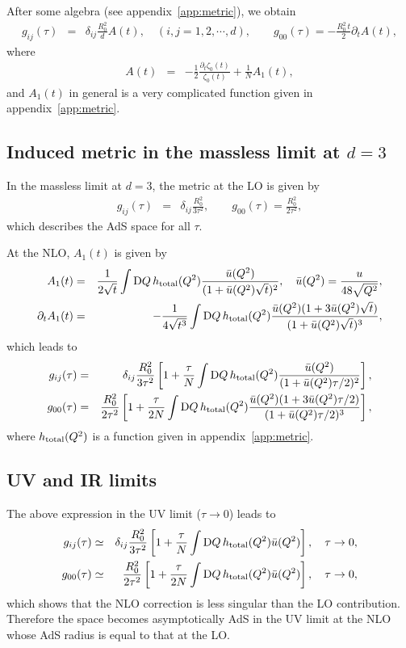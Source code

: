 \documentclass[preprint]{ptephy_v1}%
\newcommand{\rmD}{{\rm D}}
\begin{document}
After some  algebra (see appendix~\ref{app:metric}), we obtain
\begin{eqnarray}
g_{ij}(\tau) &=& \delta_{ij}\frac{ R_0^2}{d} A(t), \quad (i,j=1, 2, \cdots, d), \qquad g_{00}(\tau) = - \frac{ R_0^2\,  t}{2}\partial_t A(t), 
\end{eqnarray}
where
\begin{eqnarray}
A(t) &=& -\frac{1}{2} \frac{\partial_t\zeta_0(t)}{\zeta_0(t)} +\frac{1}{N}A_1(t), 
\end{eqnarray}
and $A_1(t)$ in general is a very complicated function given in appendix~\ref{app:metric}.

\subsection{Induced metric in the massless limit at $d=3$}
In the massless limit at $d=3$, the metric at the LO  is  given by 
 \begin{eqnarray}
g_{ij}(\tau) &=&\delta_{ij} \frac{R_0^2}{3\tau^2}, \qquad g_{00}(\tau) = \frac{R_0^2}{2\tau^2},
\end{eqnarray}
which describes the AdS space for all $\tau$.

At the NLO, $A_1(t)$ is given by
\begin{eqnarray}
A_1(t) &=&  \frac{1}{2\sqrt{t}}\int \rmD Q\, h_{\rm total}(Q^2)\frac{\bar u(Q^2)}{(1+\bar u(Q^2)\sqrt{t})^2}, 
\quad \bar u(Q^2) = \frac{u}{48\sqrt{Q^2}}, \label{eq:A1} \\
\partial_t A_1(t) &=&  -\frac{1}{4\sqrt{t^3}}\int \rmD Q\, h_{\rm total}(Q^2)\frac{\bar u(Q^2)(1+3\bar u(Q^2)\sqrt{t})}{(1+\bar u(Q^2)\sqrt{t})^3}, \label{eq:pA1} 
\end{eqnarray}
which leads to
\begin{eqnarray}
g_{ij}(\tau) &=&\delta_{ij}\frac{R_0^2}{3 \tau^2} \left[1 +\frac{\tau}{N}\int \rmD Q\, h_{\rm total}(Q^2)
\frac{\bar u(Q^2)}{(1+\bar u(Q^2)\tau/2)^2}\right], 
\label{eq:metric_space}\\
g_{00}(\tau) &=& \frac{R_0^2}{2\tau^2} \left[1 +\frac{\tau}{2N}\int \rmD Q\, h_{\rm total}(Q^2)
\frac{\bar u(Q^2)(1+3\bar u(Q^2)\tau/2)}{(1+\bar u(Q^2)\tau/2)^3} \right] ,
\label{eq:metric_time}
\end{eqnarray}
where $h_{\rm total}(Q^2)$ is a function given in appendix~\ref{app:metric}. 

\subsection{UV and IR limits}
The above expression  in the UV limit ($\tau\rightarrow 0$) leads to
\begin{eqnarray}
g_{ij}(\tau) &\simeq&\delta_{ij}\frac{R_0^2}{3\tau^2} \left[1 +\frac{\tau}{N}\int \rmD Q\, h_{\rm total}(Q^2)
\bar u(Q^2)\right], \quad \tau\rightarrow 0, \\
g_{00}(\tau) &\simeq& \frac{R_0^2}{2 \tau^2} \left[1 +\frac{\tau}{2N}\int \rmD Q\, h_{\rm total}(Q^2)
\bar u(Q^2) \right] , \quad \tau\rightarrow 0,
\end{eqnarray}
which shows that the NLO correction is less singular than the LO contribution. Therefore
the space becomes asymptotically AdS in the UV limit at the NLO whose AdS radius is equal to that at the LO.  
\end{document}
